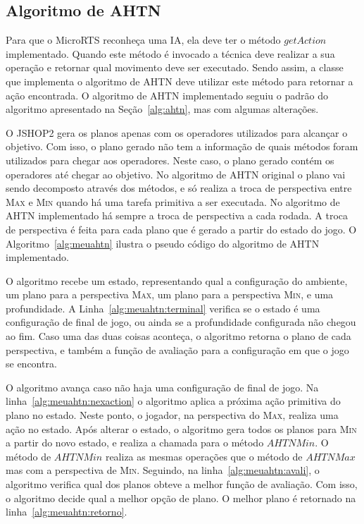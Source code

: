 \subsection{Algoritmo de AHTN}

Para que o MicroRTS reconheça uma IA, ela deve ter o método $\mathit{getAction}$ implementado.
Quando este método é invocado a técnica deve realizar a sua operação e retornar qual movimento deve ser executado.
Sendo assim, a classe que implementa o algoritmo de AHTN deve utilizar este método para retornar a ação encontrada.
O algoritmo de AHTN implementado seguiu o padrão do algoritmo apresentado na Seção~\ref{alg:ahtn}, mas com algumas alterações.

O JSHOP2 gera os planos apenas com os operadores utilizados para alcançar o objetivo.
Com isso, o plano gerado não tem a informação de quais métodos foram utilizados para chegar aos operadores.
Neste caso, o plano gerado contém os operadores até chegar ao objetivo.
No algoritmo de AHTN original o plano vai sendo decomposto através dos métodos, e só realiza a troca de perspectiva entre \textsc{Max} e \textsc{Min} quando há uma tarefa primitiva a ser executada.
No algoritmo de AHTN implementado há sempre a troca de perspectiva a cada rodada.
A troca de perspectiva é feita para cada plano que é gerado a partir do estado do jogo.
O Algoritmo~\ref{alg:meuahtn} ilustra o pseudo código do algoritmo de AHTN implementado.

O algoritmo recebe um estado, representando qual a configuração do ambiente, um plano para a perspectiva \textsc{Max}, um plano para a perspectiva \textsc{Min}, e uma profundidade.
A Linha~\ref{alg:meuahtn:terminal} verifica se o estado é uma configuração de final de jogo, ou ainda se a profundidade configurada não chegou ao fim.
Caso uma das duas coisas aconteça, o algoritmo retorna o plano de cada perspectiva, e também a função de avaliação para a configuração em que o jogo se encontra.

O algoritmo avança caso não haja uma configuração de final de jogo.
Na linha~\ref{alg:meuahtn:nexaction} o algoritmo aplica a próxima ação primitiva do plano no estado.
Neste ponto, o jogador, na perspectiva do \textsc{Max}, realiza uma ação no estado.
Após alterar o estado, o algoritmo gera todos os planos para \textsc{Min} a partir do novo estado, e realiza a chamada para o método $\mathit{AHTNMin}$.
O método de $\mathit{AHTNMin}$ realiza as mesmas operações que o método de $\mathit{AHTNMax}$ mas com a perspectiva de \textsc{Min}.
Seguindo, na linha~\ref{alg:meuahtn:avali}, o algoritmo verifica qual dos planos obteve a melhor função de avaliação. 
Com isso, o algoritmo decide qual a melhor opção de plano.
O melhor plano é retornado na linha~\ref{alg:meuahtn:retorno}.


